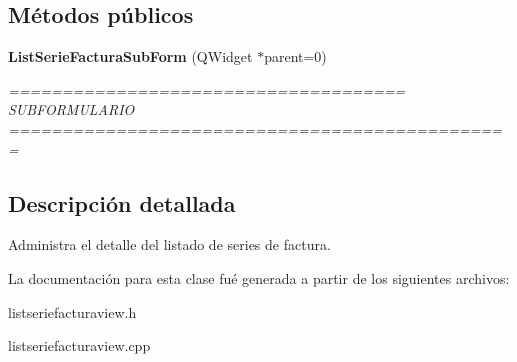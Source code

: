 \subsection*{M\'{e}todos p\'{u}blicos}
\begin{CompactItemize}
\item 
{\bf List\-Serie\-Factura\-Sub\-Form} (QWidget $\ast$parent=0)\label{classListSerieFacturaSubForm_a0}

\begin{CompactList}\small\item\em ===================================== SUBFORMULARIO =============================================== \item\end{CompactList}\end{CompactItemize}


\subsection{Descripci\'{o}n detallada}
Administra el detalle del listado de series de factura. 



La documentaci\'{o}n para esta clase fu\'{e} generada a partir de los siguientes archivos:\begin{CompactItemize}
\item 
listseriefacturaview.h\item 
listseriefacturaview.cpp\end{CompactItemize}
